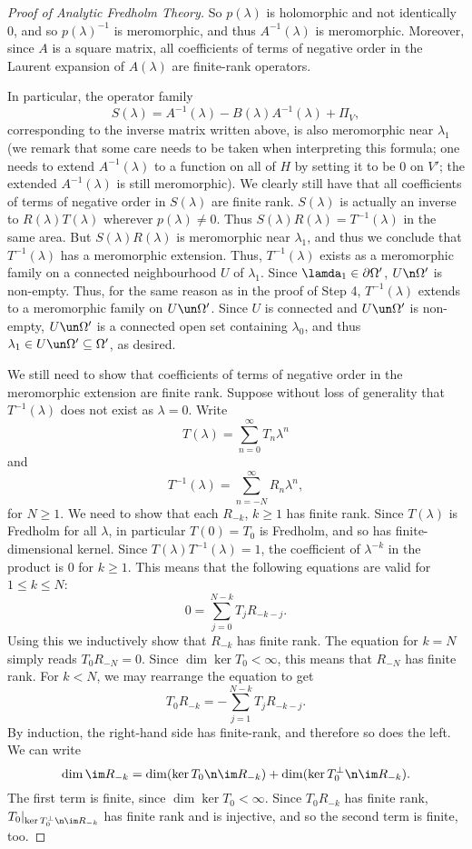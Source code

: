 \documentclass[12pt]{article}
\begin{document}
\begin{proof}[Proof of Analytic Fredholm Theory]
So $p(\lambda)$ is holomorphic and not identically $0$, and so $p(\lambda)^{-1}$ is meromorphic, and thus $A^{-1}(\lambda)$ is meromorphic. Moreover, since $A$ is a square matrix, all coefficients of terms of negative order in the Laurent expansion of $A(\lambda)$ are finite-rank operators.

In particular, the operator family
\[S(\lambda) = A^{-1}(\lambda) -B(\lambda)A^{-1}(\lambda) + \Pi_V,\] corresponding to the inverse matrix written above, is also meromorphic near $\lambda_1$ (we remark that some care needs to be taken when interpreting this formula; one needs to extend $A^{-1}(\lambda)$ to a function on all of $H$ by setting it to be $0$ on $V'$; the extended $A^{-1}(\lambda)$ is still meromorphic). We clearly still have that all coefficients of terms of negative order in $S(\lambda)$ are finite rank. $S(\lambda)$ is actually an inverse to $R(\lambda)T(\lambda)$ wherever $p(\lambda) \neq 0$. Thus $S(\lambda)R(\lambda) = T^{-1}(\lambda)$ in the same area. But $S(\lambda)R(\lambda)$ is meromorphic near $\lambda_1$, and thus we conclude that $T^{-1}(\lambda)$ has a meromorphic extension. Thus, $T^{-1}(\lambda)$ exists as a meromorphic family on a connected neighbourhood $U$ of $\lambda_1$. Since $\lamda_1 \in \partial \Omega'$, $U\n \Omega'$ is non-empty. Thus, for the same reason as in the proof of Step 4, $T^{-1}(\lambda)$ extends to a meromorphic family on $U \un \Omega'$. Since $U$ is connected and $U \un \Omega'$ is non-empty, $U\un\Omega'$ is a connected open set containing $\lambda_0$, and thus $\lambda_1 \in U\un \Omega' \subseteq \Omega'$, as desired.

We still need to show that coefficients of terms of negative order in the meromorphic extension are finite rank. Suppose without loss of generality that $T^{-1}(\lambda)$ does not exist as $\lambda=0$. Write
\[T(\lambda) = \sum_{n=0}^\infty T_n\lambda^n\] and
\[T^{-1}(\lambda) = \sum_{n=-N}^\infty R_n\lambda^n,\]
for $N \geq 1$. We need to show that each $R_{-k}$, $k \geq 1$ has finite rank. Since $T(\lambda)$ is Fredholm for all $\lambda$, in particular $T(0) = T_0$ is Fredholm, and so has finite-dimensional kernel. Since $T(\lambda)T^{-1}(\lambda) = 1$, the coefficient of $\lambda^{-k}$ in the product is $0$ for $k \geq 1$. This means that the following equations are valid for $1 \leq k \leq N$:
\[0 = \sum_{j=0}^{N-k} T_jR_{-k-j}.\]
Using this we inductively show that $R_{-k}$ has finite rank. The equation for $k=N$ simply reads $T_0R_{-N} = 0$. Since $\dim \ker T_0 < \infty$, this means that $R_{-N}$ has finite rank. For $k < N$, we may rearrange the equation to get
\[T_0R_{-k} = -\sum_{j=1}^{N-k} T_jR_{-k-j}.\] By induction, the right-hand side has finite-rank, and therefore so does the left. We can write
\[\dim \im R_{-k} = \dim (\ker T_0 \n \im R_{-k}) + \dim (\ker T_0^\bot \n \im R_{-k}).\] The first term is finite, since $\dim \ker T_0 < \infty$. Since $T_0R_{-k}$ has finite rank, $T_0|_{\ker T_0^\bot\n\im R_{-k}}$ has finite rank and is injective, and so the second term is finite, too.\end{proof}
\end{document}
